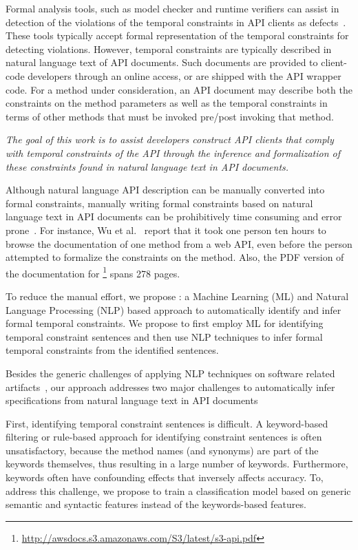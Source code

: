 Formal analysis tools, such as model checker and runtime verifiers can assist in detection of the violations of the temporal constraints in API clients as defects~\cite{lee2012towards}.
These tools typically accept formal representation of the temporal constraints for detecting violations.
However, temporal constraints are typically described in natural language text of API documents.
Such documents are provided to client-code developers through an online access, or are shipped with the API wrapper code.
For a method under consideration, an API document may describe both the constraints on the method parameters
as well as the temporal constraints in terms of other methods that must be invoked pre/post invoking that method.

\textit{The goal of this work is to assist developers construct API clients that comply with
	temporal constraints of the API through the inference and formalization of these constraints found in natural language text in API documents.}

Although natural language API description can be manually converted into formal constraints,
manually writing formal constraints based on natural language text in API documents can be prohibitively time consuming and error prone~\cite{wu2013inferring,RubingerWEB10}. 
For instance, Wu et al.~\cite{wu2013inferring} report that it took one person ten hours to browse the documentation of one method from a web API, even before the person attempted to formalize the constraints on the method. Also, the PDF version of the documentation for \amazonAPI\footnote{{\small \url{http://awsdocs.s3.amazonaws.com/S3/latest/s3-api.pdf}}} spans 278 pages.


To reduce the manual effort, we propose \tool: a Machine Learning (ML) and Natural Language Processing (NLP) based approach
to automatically identify and infer formal temporal constraints. 
We propose to first employ ML for identifying temporal constraint sentences and then use NLP techniques to infer formal temporal constraints from the identified sentences. 

Besides the generic challenges of applying NLP techniques on software related artifacts~\cite{pandita12:inferring},
our approach addresses two major challenges to automatically infer specifications from natural language text in API documents 

First, identifying temporal constraint sentences is difficult. A keyword-based filtering or rule-based approach for identifying constraint sentences is often unsatisfactory, because the method names (and synonyms) are part of the keywords themselves, thus resulting in a large number of keywords.
Furthermore, keywords often have confounding effects that inversely affects accuracy.
To, address this challenge, we propose to train a classification model based on generic semantic and syntactic features instead of the keywords-based features.    

